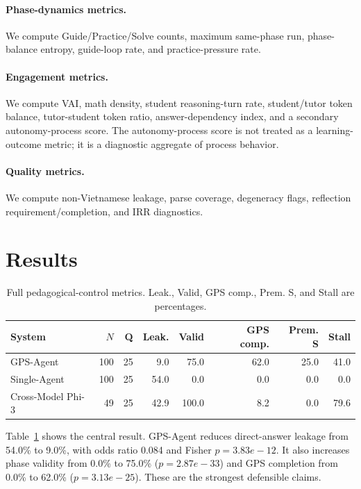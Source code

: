 \documentclass[11pt]{article}
\begin{document}
\paragraph{Phase-dynamics metrics.} We compute Guide/Practice/Solve counts, maximum same-phase run, phase-balance entropy, guide-loop rate, and practice-pressure rate.

\paragraph{Engagement metrics.} We compute VAI, math density, student reasoning-turn rate, student/tutor token balance, tutor-student token ratio, answer-dependency index, and a secondary autonomy-process score. The autonomy-process score is not treated as a learning-outcome metric; it is a diagnostic aggregate of process behavior.

\paragraph{Quality metrics.} We compute non-Vietnamese leakage, parse coverage, degeneracy flags, reflection requirement/completion, and IRR diagnostics.

\section{Results}
\begin{table}[t]
\centering
\small
\begin{tabular}{lrrrrrrr}
\toprule
System & $N$ & Q & Leak. & Valid & GPS comp. & Prem. S & Stall \\
\midrule
GPS-Agent & 100 & 25 & 9.0 & 75.0 & 62.0 & 25.0 & 41.0 \\
Single-Agent & 100 & 25 & 54.0 & 0.0 & 0.0 & 0.0 & 0.0 \\
Cross-Model Phi-3 & 49 & 25 & 42.9 & 100.0 & 8.2 & 0.0 & 79.6 \\
\bottomrule
\end{tabular}
\caption{Full pedagogical-control metrics. Leak., Valid, GPS comp., Prem. S, and Stall are percentages.}
\label{tab:control}
\end{table}

Table~\ref{tab:control} shows the central result. GPS-Agent reduces direct-answer leakage from 54.0\% to 9.0\%, with odds ratio 0.084 and Fisher $p=3.83e-12$. It also increases phase validity from 0.0\% to 75.0\% ($p=2.87e-33$) and GPS completion from 0.0\% to 62.0\% ($p=3.13e-25$). These are the strongest defensible claims.
\end{document}
